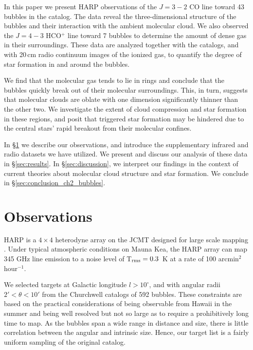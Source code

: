 In this paper we present HARP observations of the $J=3-2$ CO line
toward 43 bubbles in the  catalog.
The data reveal the three-dimensional structure of the bubbles
and their interaction with the ambient molecular cloud.
We also observed the $J=4-3$ HCO$^+$ line toward 7 bubbles
to determine the amount of dense gas in their surroundings.
These data are analyzed together with the \glimpse catalogs,
and with 20\,cm radio continuum images of the ionized gas,
to quantify the degree of star formation in and around the bubbles.


We find that the molecular gas tends to lie in rings and conclude
that the bubbles quickly break out of their molecular surroundings.
This, in turn, suggests that molecular clouds are oblate with
one dimension significantly thinner than the other two.
We investigate the extent of cloud compression and star formation in these regions,
and posit that triggered star formation may be hindered due
to the central stars' rapid breakout from their molecular confines.

In \S\ref{sec:observations} we describe our observations, and introduce the supplementary infrared and radio datasets
we have utilized. We present and discuss our analysis of these data in \S\ref{sec:results}. In \S\ref{sec:discussion},
we interpret our findings in the context of current theories about molecular cloud structure and star formation. We conclude in
\S\ref{sec:conclusion_ch2_bubbles}.

\section{Observations}
\label{sec:observations}

HARP is a $4\times 4$ heterodyne array on the JCMT
designed for large scale mapping \citep{Smith08}. Under typical
atmospheric conditions on Mauna Kea, the HARP array can map 345 GHz line emission
to a noise level of T$_{\rm rms} = 0.3$\, K at a rate of
100 arcmin$^{2}$ hour$^{-1}$.

We selected targets at Galactic longitude $l>10^\circ$,
and with angular radii $2' < \theta < 10'$ from the Churchwell
catalogs of 592 bubbles. These constraints are based on the
practical considerations of being observable from Hawaii in the
summer and being well resolved but not so large as to require a
prohibitively long time to map.
As the bubbles span a wide range in distance and size,
there is little correlation between the angular and intrinsic size.
Hence, our target list is a fairly uniform sampling of the original catalog.

